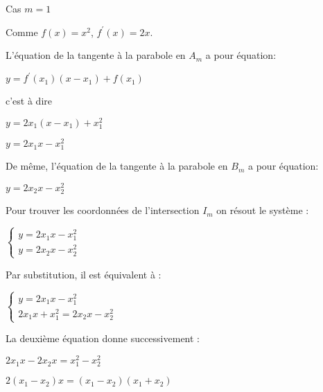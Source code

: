 \begin{corrige}
\begin{enumerate}
\begin{enumerate}
\begin{center}
\end{center}
               \begin{center}Cas $m=1$\end{center}
               Comme $f\left(x\right)=x^{2}$,  $f^{\prime}\left(x\right)=2x$.
               \par
               L'équation de la tangente à la parabole en $A_{m}$ a pour équation:
               \par
               $y=f^{\prime}\left(x_{1}\right)\left(x-x_{1}\right)+f\left(x_{1}\right)$
               \par
               c'est à dire
               \par
               $y=2x_{1}\left(x-x_{1}\right)+x_{1}^{2}$
               \par
               $y=2x_{1}x-x_{1}^{2}$
               \par
               De même, l'équation de la tangente à la parabole en $B_{m}$ a pour équation:
               \par
               $y=2x_{2}x-x_{2}^{2}$
               \par
               Pour trouver les coordonnées de l'intersection $I_{m}$ on résout le système :
               \par
               $\left\{ \begin{matrix} y=2x_{1}x-x_{1}^{2} \\ y=2x_{2}x-x_{2}^{2} \end{matrix}\right.$
                    \par
                    Par substitution, il est équivalent à :
                    \par
                    $\left\{ \begin{matrix} y=2x_{1}x-x_{1}^{2} \\ 2x_{1}x+x_{1}^{2}=2x_{2}x-x_{2}^{2} \end{matrix}\right.$
                         \par
                         La deuxième équation donne successivement :
                         \par
                         $2x_{1}x-2x_{2}x=x_{1}^{2}-x_{2}^{2}$
                         \par
                         $2\left(x_{1}-x_{2}\right)x=\left(x_{1}-x_{2}\right)\left(x_{1}+x_{2}\right)$
                         \par

\end{enumerate}
\end{enumerate}
\end{corrige}
